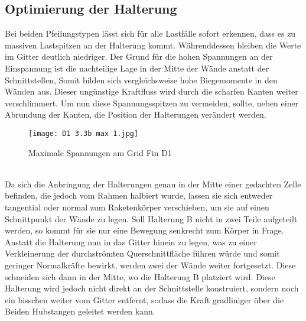 \subsection{Optimierung der Halterung}
Bei beiden Pfeilungstypen lässt sich für alle Lastfälle sofort erkennen, dass es zu massiven Lastspitzen an der Halterung kommt. Währenddessen bleiben die Werte im Gitter deutlich niedriger. Der Grund für die hohen Spannungen an der Einspannung ist die nachteilige Lage in der Mitte der Wände anstatt der Schnittstellen, Somit bilden sich vergleichsweise hohe Biegemomente in den Wänden aus. Dieser ungünstige Kraftfluss wird durch die scharfen Kanten weiter verschlimmert. Um nun diese Spannungsspitzen zu vermeiden, sollte, neben einer Abrundung der Kanten, die Position der Halterungen verändert werden.
\begin{figure}[h] 
	\centering
	\texttt{[image: D1 3.3b max 1.jpg]}
	\caption{Maximale Spannungen am Grid Fin D1}
\end{figure}\\
Da sich die Anbringung der Halterungen genau in der Mitte einer gedachten Zelle befinden, die jedoch vom Rahmen halbiert wurde, lassen sie sich entweder tangential oder normal zum Raketenkörper verschieben, um sie auf einen Schnittpunkt der Wände zu legen. Soll Halterung B nicht in zwei Teile aufgeteilt werden, so kommt für sie nur eine Bewegung senkrecht zum Körper in Frage. Anstatt die Halterung nun in das Gitter hinein zu legen, was zu einer Verkleinerung der durchströmten Querschnittfläche führen würde und somit geringer Normalkräfte bewirkt, werden zwei der Wände weiter fortgesetzt. Diese schneiden sich dann in der Mitte, wo die Halterung B platziert wird. Diese Halterung wird jedoch nicht direkt an der Schnittstelle konstruiert, sondern noch ein bisschen weiter vom Gitter entfernt, sodass die Kraft gradliniger über die Beiden Hubstangen geleitet werden kann.

